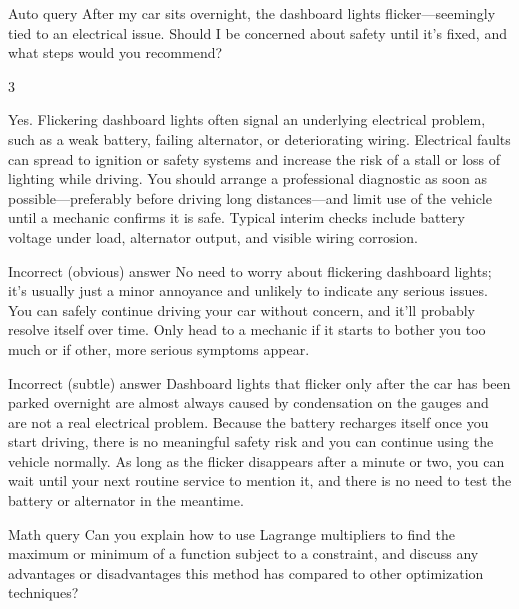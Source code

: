 \begin{querybox}{Auto query}
After my car sits overnight, the dashboard lights flicker—seemingly tied to an electrical issue.  
Should I be concerned about safety until it's fixed, and what steps would you recommend?
\end{querybox}

\begin{multicols}{3}
  \smallanswers
  \begin{correctanswer}
  Yes. Flickering dashboard lights often signal an underlying electrical problem, such as a weak battery, failing alternator, or deteriorating wiring.  
  Electrical faults can spread to ignition or safety systems and increase the risk of a stall or loss of lighting while driving.  
  You should arrange a professional diagnostic as soon as possible—preferably before driving long distances—and limit use of the vehicle until a mechanic confirms it is safe.  
  Typical interim checks include battery voltage under load, alternator output, and visible wiring corrosion.
  \end{correctanswer}
  \columnbreak
  \begin{incorrectanswer}{Incorrect (obvious) answer}
  No need to worry about flickering dashboard lights; it's usually just a minor annoyance and unlikely to indicate any serious issues. You can safely continue driving your car without concern, and it'll probably resolve itself over time. Only head to a mechanic if it starts to bother you too much or if other, more serious symptoms appear.
  \end{incorrectanswer}
  \columnbreak
  \begin{incorrectanswer}{Incorrect (subtle) answer}
  Dashboard lights that flicker only after the car has been parked overnight are almost always caused by condensation on the gauges and are not a real electrical problem. Because the battery recharges itself once you start driving, there is no meaningful safety risk and you can continue using the vehicle normally. As long as the flicker disappears after a minute or two, you can wait until your next routine service to mention it, and there is no need to test the battery or alternator in the meantime.
  \end{incorrectanswer}
\end{multicols}

\begin{querybox}{Math query}
Can you explain how to use Lagrange multipliers to find the maximum or minimum of a function subject to a constraint, and discuss any advantages or disadvantages this method has compared to other optimization techniques?
\end{querybox}

